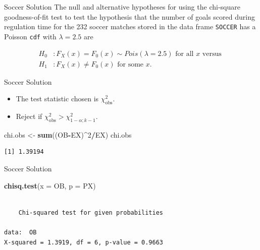 \documentclass[
  ignorenonframetext,
]{beamer}
\newenvironment{Shaded}{\begin{snugshade}}{\end{snugshade}}
\newcommand{\AttributeTok}[1]{\textcolor[rgb]{0.13,0.29,0.53}{#1}}
\newcommand{\DecValTok}[1]{\textcolor[rgb]{0.00,0.00,0.81}{#1}}
\newcommand{\FunctionTok}[1]{\textcolor[rgb]{0.13,0.29,0.53}{\textbf{#1}}}
\newcommand{\NormalTok}[1]{#1}
\newcommand{\OtherTok}[1]{\textcolor[rgb]{0.56,0.35,0.01}{#1}}
\newcommand{\SpecialCharTok}[1]{\textcolor[rgb]{0.81,0.36,0.00}{\textbf{#1}}}
\begin{document}
\begin{frame}[fragile]{Soccer Solution}
\protect\hypertarget{soccer-solution-4}{}
The null and alternative hypotheses for using the chi-square
goodness-of-fit test to test the hypothesis that the number of goals
scored during regulation time for the 232 soccer matches stored in the
data frame \texttt{SOCCER} has a Poisson \texttt{cdf} with
\(\lambda=2.5\) are

\begin{align*}
        H_0&: F_X(x) = F_0(x) \sim Pois(\lambda=2.5)\text{ for all } x \text{ versus
        }\\
        H_1&:  F_X(x) \ne F_0(x) \text{ for some } x.
\end{align*}
\end{frame}

\begin{frame}[fragile]{Soccer Solution}
\protect\hypertarget{soccer-solution-5}{}
\begin{itemize}
\item
  The test statistic chosen is \(\chi_{\text{obs}}^2.\)
\item
  Reject if \(\chi^2_{\text{obs}}>\chi^2_{1-\alpha;k-1}\).
\end{itemize}

\begin{Shaded}
\begin{Highlighting}[]
\NormalTok{chi.obs }\OtherTok{\textless{}{-}} \FunctionTok{sum}\NormalTok{((OB}\SpecialCharTok{{-}}\NormalTok{EX)}\SpecialCharTok{\^{}}\DecValTok{2}\SpecialCharTok{/}\NormalTok{EX)}
\NormalTok{chi.obs}
\end{Highlighting}
\end{Shaded}

\begin{verbatim}
[1] 1.39194
\end{verbatim}
\end{frame}

\begin{frame}[fragile]{Soccer Solution}
\protect\hypertarget{soccer-solution-6}{}
\begin{Shaded}
\begin{Highlighting}[]
\FunctionTok{chisq.test}\NormalTok{(}\AttributeTok{x =}\NormalTok{ OB, }\AttributeTok{p =}\NormalTok{ PX)}
\end{Highlighting}
\end{Shaded}

\begin{verbatim}

    Chi-squared test for given probabilities

data:  OB
X-squared = 1.3919, df = 6, p-value = 0.9663
\end{verbatim}
\end{frame}
\end{document}
